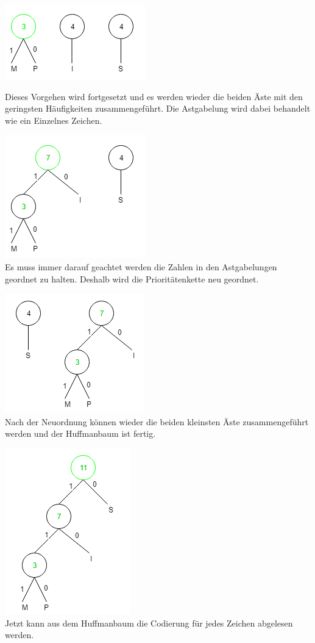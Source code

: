 \documentclass{article}
\begin{document}
\includegraphics{./img/huffman2.png}\\

\pagebreak

Dieses Vorgehen wird fortgesetzt und es werden wieder die beiden Äste mit den geringsten Häufigkeiten zusammengeführt. Die Astgabelung wird dabei behandelt wie ein Einzelnes Zeichen.

\includegraphics{./img/huffman3.png}\\

Es muss immer darauf geachtet werden die Zahlen in den Astgabelungen geordnet zu halten. Deshalb wird die Prioritätenkette neu geordnet.

\includegraphics{./img/huffman4.png}\\
Nach der Neuordnung können wieder die beiden kleinsten Äste zusammengeführt werden und der Huffmanbaum ist fertig.

\includegraphics{./img/huffman5.png}\\
Jetzt kann aus dem Huffmanbaum die Codierung für jedes Zeichen abgelesen werden.\\
\end{document}
